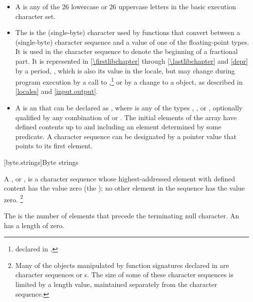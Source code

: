\begin{itemize}
\item
A  is any of the 26 lowercase or 26
%
%
uppercase letters in the basic execution character set.
\item
The
is the
(single-byte) character used by functions that convert between a (single-byte)
character sequence and a value of one of the floating-point types.
It is used
in the character sequence to denote the beginning of a fractional part.
It is
represented in \ref{\firstlibchapter} through \ref{\lastlibchapter}
and \ref{depr} by a period,
%
,
which is
also its value in the 
locale, but may change during program
execution by a call to
,\footnote{declared in
.
%
}
or by a change to a
object, as described in \ref{locales} and \ref{input.output}.
\item
A
is an   that
can be declared as
,
where  is any of the types
,
,
or
, optionally qualified by any combination of
or
.
The initial elements of the
array have defined contents up to and including an element determined by some
predicate.
A character sequence can be designated by a pointer value
 that points to its first element.
\end{itemize}

[byte.strings]{Byte strings}

%
\pnum
A ,
or \ntbs{},
is a character sequence whose highest-addressed element
with defined content has the value zero
(the );
no other element in the sequence has the value zero.%
\footnote{Many of the objects manipulated by
function signatures declared in
 are character sequences or \ntbs{}s.
The size of some of these character sequences is limited by
a length value, maintained separately from the character sequence.}

\pnum
The 
is the number of elements that
precede the terminating null character.
An 
has a length of zero.

